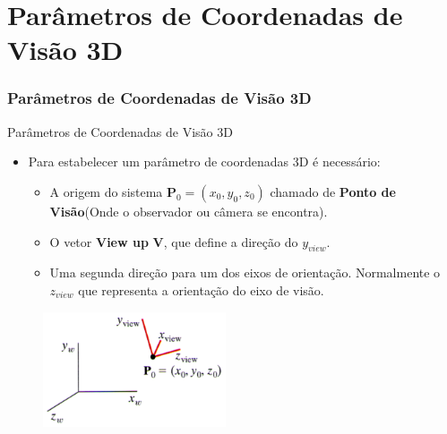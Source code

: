 \documentclass{beamer}
\begin{document}
\section{Parâmetros de Coordenadas de Visão 3D}
\begin{frame}
\frametitle{Parâmetros de Coordenadas de Visão 3D}
	\begin{block}{Parâmetros de Coordenadas de Visão 3D}
		\begin{itemize}
			\item Para estabelecer um parâmetro de coordenadas 3D é necessário:
				\begin{itemize}
					\item A origem do sistema $ \textbf{P}_0 =(x_0,y_0,z_0)$ chamado de \textbf{Ponto de Visão}(Onde o observador ou câmera se encontra).
					\item O vetor \textbf{View up} \textbf{V}, que define a direção do $y_{view}$.
					\item Uma segunda direção para um dos eixos de orientação. Normalmente o $z_{view}$ que representa a orientação do eixo de visão.
				\end{itemize}
		\end{itemize}
	\end{block}
	
	\begin{figure}[!h]
			\begin{center}
			\includegraphics[width=0.48\textwidth]{Figures/3DSisCoo}
			\end{center}
	\end{figure}
\end{frame}
\end{document}
